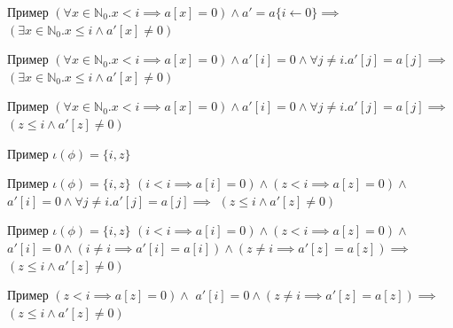 \documentclass{beamer}
\begin{document}
\begin{frame}{Пример}
$(\forall x \in \mathbb{N}_0. x < i \implies a[x] = 0) \wedge a' = a\{i\leftarrow 0\} \implies$\newline
$(\exists x \in \mathbb{N}_0. x \le i \wedge a'[x] \ne 0)$
\end{frame}

\begin{frame}{Пример}
$(\forall x \in \mathbb{N}_0. x < i \implies a[x] = 0) \wedge a'[i] = 0 \wedge \forall j \ne i. a'[j] = a[j] \implies$\newline
$(\exists x \in \mathbb{N}_0. x \le i \wedge a'[x] \ne 0)$
\end{frame}

\begin{frame}{Пример}
$(\forall x \in \mathbb{N}_0. x < i \implies a[x] = 0) \wedge a'[i] = 0 \wedge \forall j \ne i. a'[j] = a[j] \implies$\newline
$(z \le i \wedge a'[z] \ne 0)$
\end{frame}

\begin{frame}{Пример}
$\iota(\phi) = \{i, z\}$
\end{frame}

\begin{frame}{Пример}
$\iota(\phi) = \{i, z\}$\newline
$(i < i \implies a[i] = 0) \wedge (z < i \implies a[z] = 0) \wedge$\newline
$a'[i] = 0 \wedge \forall j \ne i. a'[j] = a[j] \implies$\newline
$(z \le i \wedge a'[z] \ne 0)$
\end{frame}

\begin{frame}{Пример}
$\iota(\phi) = \{i, z\}$\newline
$(i < i \implies a[i] = 0) \wedge (z < i \implies a[z] = 0) \wedge$\newline
$a'[i] = 0 \wedge (i \ne i \implies a'[i] = a[i]) \wedge (z \ne i \implies a'[z] = a[z])\implies$\newline
$(z \le i \wedge a'[z] \ne 0)$
\end{frame}

\begin{frame}{Пример}
$(z < i \implies a[z] = 0) \wedge$\newline
$a'[i] = 0 \wedge (z \ne i \implies a'[z] = a[z])\implies$\newline
$(z \le i \wedge a'[z] \ne 0)$
\end{frame}
\end{document}
